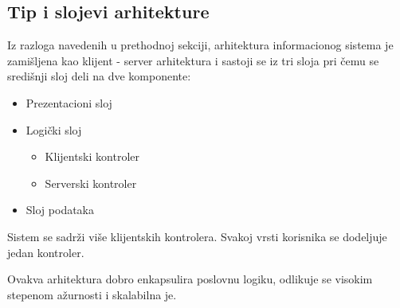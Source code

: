\subsection{Tip i slojevi arhitekture}

Iz razloga navedenih u prethodnoj sekciji, arhitektura informacionog sistema je zamišljena kao klijent - server arhitektura i sastoji se iz tri sloja pri čemu se središnji sloj deli na dve komponente: 
\begin{itemize}
    \item Prezentacioni sloj
    \item Logički sloj
    \begin{itemize}
        \item Klijentski kontroler 
        \item Serverski kontroler
    \end{itemize}
    \item Sloj podataka
\end{itemize}
 Sistem se sadrži više klijentskih kontrolera. Svakoj vrsti korisnika se dodeljuje jedan kontroler.
 
 Ovakva arhitektura dobro enkapsulira poslovnu logiku, odlikuje se visokim stepenom ažurnosti i skalabilna je.
 





